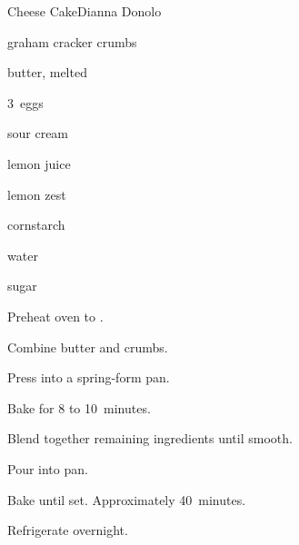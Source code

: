 \begin{recipe}{Cheese Cake}{Dianna Donolo}{}

\begin{ingredients}
\item \C{2\half} graham cracker crumbs
\item \C{\half} butter, melted
\item 3~eggs
\item {} 
\item {} sour cream
\item {} 
\item {} lemon juice
\item {} lemon zest
\item {} cornstarch
\item {} water
\item {} sugar
\end{ingredients}

\begin{directions}
\item Preheat oven to .
\item Combine butter and crumbs.
\item Press into a spring-form pan.
\item Bake for 8 to 10~minutes.
\item Blend together remaining ingredients until smooth.
\item Pour into pan.
\item Bake until set. Approximately 40~minutes.
\item Refrigerate overnight.
\end{directions}

\end{recipe}
